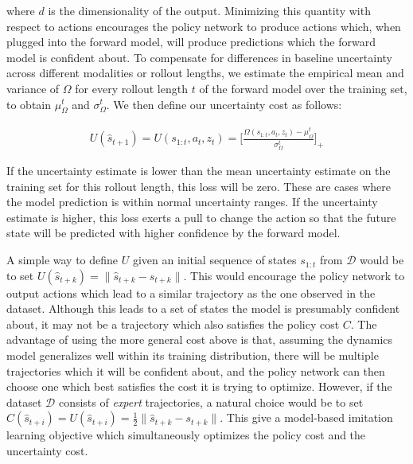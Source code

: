 \documentclass{article} %
\begin{document}
where $d$ is the dimensionality of the output. Minimizing this quantity with respect to actions encourages the policy network to produce actions which, when plugged into the forward model, will produce predictions which the forward model is confident about.
    To compensate for differences in baseline uncertainty across different modalities or rollout lengths, we estimate the empirical mean and variance of $\Omega$ for every rollout length $t$ of the forward model over the training set, to obtain $\mu_{\Omega}^t$ and $\sigma_{\Omega}^t$. We then define our uncertainty cost as follows:

    \begin{align}
      U(\hat{s}_{t+1}) = U(s_{1:t}, a_t, z_t) = \Big [ \frac{\Omega(s_{1:t}, a_t, z_t) - \mu_\Omega^t}{\sigma_\Omega^t} \Big]_+
    \end{align}

    If the uncertainty estimate is lower than the mean uncertainty estimate on the training set for this rollout length, this loss will be zero.
    These are cases where the model prediction is within normal uncertainty ranges. If the uncertainty estimate is higher, this loss exerts a pull to change the action so that the future state will be predicted with higher confidence by the forward model.



A simple way to define $U$ given an initial sequence of states $s_{1:t}$ from $\mathcal{D}$ would be to set $U(\hat{s}_{t+k}) = \|\hat{s}_{t+k} - s_{t+k}\|$.
This would encourage the policy network to output actions which lead to a similar trajectory as the one observed in the dataset.
Although this leads to a set of states the model is presumably confident about, it may not be a trajectory which also satisfies the policy cost $\textit{C}$.
The advantage of using the more general cost above is that, assuming the dynamics model generalizes well within its training distribution, there will be multiple trajectories which it will be confident about, and the policy network can then choose one which best satisfies the cost it is trying to optimize.
However, if the dataset $\mathcal{D}$ consists of \textit{expert} trajectories, a natural choice would be to set $C(\hat{s}_{t+i}) = U(\hat{s}_{t+i}) = \frac{1}{2} \|\hat{s}_{t+k} - s_{t+k}\|$. This give a model-based imitation learning objective which simultaneously optimizes the policy cost and the uncertainty cost.
\end{document}
